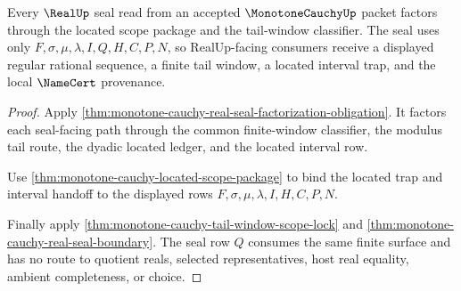 \begin{theorem}
\label{thm:monotone-cauchy-real-seal-scope-package}
Every $\RealUp$ seal read from an accepted $\MonotoneCauchyUp$ packet factors
through the located scope package and the tail-window classifier. The seal
uses only $F,\sigma,\mu,\lambda,I,Q,H,C,P,N$, so RealUp-facing consumers
receive a displayed regular rational sequence, a finite tail window, a
located interval trap, and the local $\NameCert$ provenance.
\end{theorem}
\begin{proof}
Apply \autoref{thm:monotone-cauchy-real-seal-factorization-obligation}. It
factors each seal-facing path through the common finite-window classifier, the
modulus tail route, the dyadic located ledger, and the located interval row.

Use \autoref{thm:monotone-cauchy-located-scope-package} to bind the located
trap and interval handoff to the displayed rows
$F,\sigma,\mu,\lambda,I,H,C,P,N$.

Finally apply \autoref{thm:monotone-cauchy-tail-window-scope-lock} and
\autoref{thm:monotone-cauchy-real-seal-boundary}. The seal row $Q$ consumes the
same finite surface and has no route to quotient reals, selected
representatives, host real equality, ambient completeness, or choice.
\end{proof}

